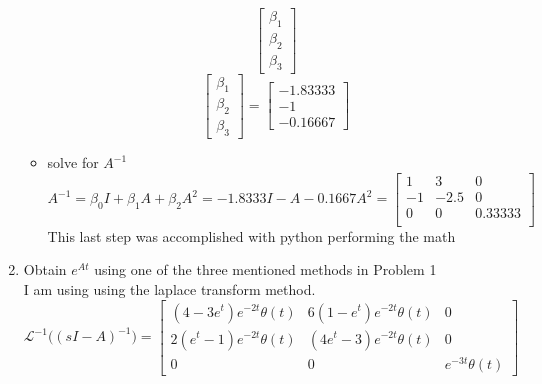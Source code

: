 \begin{enumerate}
\begin{itemize}
\begin{equation}
\begin{bmatrix}
          \beta_1 \\
          \beta_2 \\
          \beta_3 
        \end{bmatrix}
      \end{equation}
      \begin{equation}
        \begin{bmatrix}
          \beta_1 \\
          \beta_2 \\
          \beta_3 
        \end{bmatrix} = 
        \begin{bmatrix}
          -1.83333 \\
          -1 \\
          -0.16667
        \end{bmatrix}
      \end{equation}
    \item solve for $A^{-1}$
      \begin{equation}
        A^{-1} =
        \beta_0I + \beta_1A + \beta_2A^2 =
        -1.8333I - A - 0.1667A^2 =
        \begin{bmatrix}
          1 & 3 & 0 \\
          -1 & -2.5 & 0 \\
          0 & 0 & 0.33333\\
        \end{bmatrix}
      \end{equation}
      This last step was accomplished with python performing the math
    \end{itemize}
  \item Obtain $e^{At}$ using one of the three mentioned methods in Problem 1 \\
    I am using using the laplace transform method.
    \begin{equation}
\mathscr{L}^{-1}\Big ((sI-A)^{-1}\Big ) = \left[\begin{matrix}\left(4 - 3 e^{t}\right) e^{- 2 t} \theta\left(t\right) & 6 \left(1 - e^{t}\right) e^{- 2 t} \theta\left(t\right) & 0\\2 \left(e^{t} - 1\right) e^{- 2 t} \theta\left(t\right) & \left(4 e^{t} - 3\right) e^{- 2 t} \theta\left(t\right) & 0\\0 & 0 & e^{- 3 t} \theta\left(t\right)\end{matrix}\right]\end{equation}

  \end{enumerate}